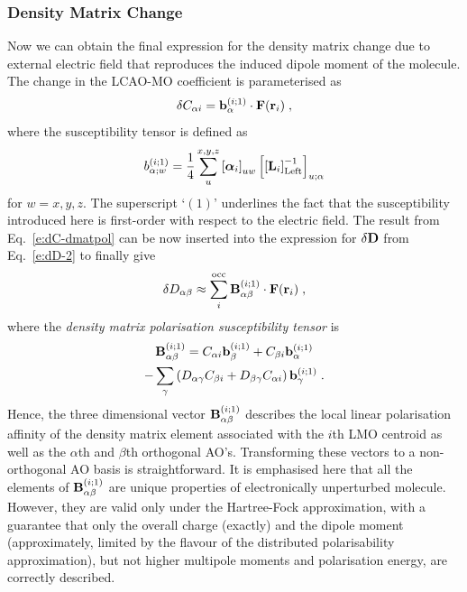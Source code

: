 \documentclass[aip,amsmath,amssymb,reprint,floatfix]{revtex4-1}
\newcommand{\BM}[1]{\bm{#1}}
\begin{document}
\subsubsection{Density Matrix Change}

Now we can obtain the final expression for the density matrix change 
due to external electric field that reproduces the 
induced dipole moment of the molecule.
The change in the LCAO\hyp{}MO coefficient is parameterised as
%
\begin{equation} \label{e:dC-dmatpol}
 \delta C_{\alpha i} = {\bf b}_{\alpha}^{(i;1)} \cdot {\bf F}({\bf r}_i)  \;,
\end{equation}
%
where the susceptibility tensor is defined as
%
\begin{equation} \label{e:susceptibility-b}
  b_{\alpha;w}^{(i;1)}= \frac{1}{4} \sum_u^{x, y, z} \left[ {\BM{\alpha}}_i \right]_{uw}
   \left[ \left[ {\bf L}_i  \right]^{-1}_{\rm Left} \right]_{u;\alpha}  
\end{equation}
%
for $w=x,y,z$. 
The superscript `$(1)$' underlines the fact that the susceptibility introduced here
is first\hyp{}order with respect to the electric field.
The result from Eq.~\eqref{e:dC-dmatpol} can be now inserted into 
the expression for $\delta {\bf D}$ from Eq.~\eqref{e:dD-2} to finally give
%
\begin{equation}\label{e:final-model.HF}
 \delta D_{\alpha\beta} \approx \sum_i^{\rm occ} {\bf B}^{(i;1)}_{\alpha\beta} \cdot {\bf F}({\bf r}_i)  \;,
\end{equation}
%
where the \emph{density matrix polarisation susceptibility tensor} is
%
\begin{multline}  \label{e:susceptibility-B}
 {\bf B}^{(i;1)}_{\alpha\beta} = 
                               C_{\alpha i} {\bf b}_{\beta}^{(i;1)} + C_{\beta i} {\bf b}_\alpha^{(i;1)} \\
                                - \sum_\gamma 
                                 \left( 
               D_{\alpha\gamma} C_{\beta i} + D_{\beta\gamma} C_{\alpha i}
                                 \right)
                                           {\bf b}_{\gamma}^{(i;1)}
 \;.
\end{multline}
%
Hence, the three dimensional vector ${\bf B}^{(i;1)}_{\alpha\beta}$ 
describes the local linear polarisation affinity 
of the density matrix element 
associated with the $i$th LMO centroid as well as the $\alpha$th and $\beta$th orthogonal AO's.
Transforming these vectors to a non\hyp{}orthogonal AO basis is straightforward.
It is emphasised here that all the elements of ${\bf B}_{\alpha\beta}^{(i;1)}$
are unique properties of electronically unperturbed molecule. 
However, they are valid only under the Hartree\hyp{}Fock
approximation, with a guarantee that only the overall charge (exactly) and the dipole moment (approximately,
limited by the flavour of the distributed polarisability approximation), 
but not higher multipole moments and polarisation energy, are correctly described.
\end{document}
